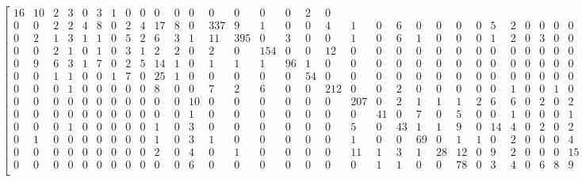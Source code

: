 \begin{equation*}
\begin{bmatrix}
16	&	10	&	2	&	3	&	0	&	3	&	1	&	0	&	0	&	0	&	0	&	0	&	0	&	0	&	0	&	0	&	2	&	0 \\
0	&	0	&	2	&	2	&	4	&	8	&	0	&	2	&	4	&	17	&	8	&	0	&	337	&	9	&	1	&	0	&	0	&	4	&	1	&	0	&	6	&	0	&	0	&	0	&	0	&
5	&	2	&	0	&	0	&	0	&	0	&	0	&	8	&	0	&	0	&	0	&	0	&	0	&	0	&	0	&	0	&	0	&	0 \\
0	&	2	&	1	&	3	&	1	&	1	&	0	&	5	&	2	&	6	&	3	&	1	&	11	&	395	&	0	&	3	&	0	&	0	&	1	&	0	&	6	&	1	&	0	&	0	&	0	&
1	&	2	&	0	&	3	&	0	&	0	&	0	&	0	&	0	&	0	&	0	&	0	&	0	&	0	&	0	&	0	&	0	&	2 \\
0	&	0	&	2	&	1	&	0	&	1	&	0	&	3	&	1	&	2	&	2	&	0	&	2	&	0	&	154	&	0	&	0	&	12	&	0	&	0	&	0	&	0	&	0	&	0	&	0	&
0	&	0	&	0	&	0	&	0	&	0	&	0	&	0	&	0	&	0	&	0	&	0	&	0	&	0	&	0	&	0	&	0	&	0 \\
0	&	9	&	6	&	3	&	1	&	7	&	0	&	2	&	5	&	14	&	1	&	0	&	1	&	1	&	1	&	96	&	1	&	0	&	0	&	0	&	0	&	0	&	0	&	0	&	0	&
0	&	0	&	0	&	0	&	0	&	0	&	0	&	1	&	0	&	0	&	0	&	0	&	0	&	0	&	0	&	0	&	0	&	1 \\
0	&	0	&	1	&	1	&	0	&	0	&	1	&	7	&	0	&	25	&	1	&	0	&	0	&	0	&	0	&	0	&	54	&	0	&	0	&	0	&	0	&	0	&	0	&	0	&	0	&
0	&	0	&	0	&	0	&	0	&	0	&	0	&	0	&	0	&	0	&	0	&	0	&	0	&	0	&	0	&	0	&	0	&	0 \\
0	&	0	&	0	&	1	&	0	&	0	&	0	&	0	&	0	&	8	&	0	&	0	&	7	&	2	&	6	&	0	&	0	&	212	&	0	&	0	&	2	&	0	&	0	&	0	&	0	&
0	&	1	&	0	&	0	&	1	&	0	&	0	&	0	&	0	&	0	&	0	&	0	&	0	&	0	&	0	&	0	&	0	&	0 \\
0	&	0	&	0	&	0	&	0	&	0	&	0	&	0	&	0	&	0	&	0	&	10	&	0	&	0	&	0	&	0	&	0	&	0	&	207	&	0	&	2	&	1	&	1	&	1	&	2	&
6	&	6	&	0	&	2	&	0	&	2	&	0	&	0	&	0	&	0	&	0	&	0	&	0	&	0	&	0	&	0	&	0	&	0 \\
0	&	0	&	0	&	0	&	0	&	0	&	0	&	0	&	0	&	0	&	0	&	1	&	0	&	0	&	0	&	0	&	0	&	0	&	0	&	41	&	0	&	7	&	0	&	5	&	0	&
0	&	1	&	0	&	0	&	0	&	1	&	4	&	0	&	0	&	0	&	0	&	0	&	0	&	0	&	0	&	0	&	0	&	0 \\
0	&	0	&	0	&	1	&	0	&	0	&	0	&	0	&	0	&	1	&	0	&	3	&	0	&	0	&	0	&	0	&	0	&	0	&	5	&	0	&	43	&	1	&	1	&	9	&	0	&
14	&	4	&	0	&	2	&	0	&	2	&	0	&	0	&	0	&	0	&	0	&	0	&	0	&	0	&	0	&	0	&	0	&	4 \\
0	&	1	&	0	&	0	&	0	&	0	&	0	&	0	&	0	&	1	&	0	&	3	&	1	&	0	&	0	&	0	&	0	&	0	&	1	&	0	&	0	&	69	&	0	&	1	&	1	&
0	&	2	&	0	&	0	&	0	&	4	&	6	&	0	&	0	&	0	&	0	&	0	&	0	&	0	&	0	&	0	&	0	&	0 \\
0	&	0	&	0	&	0	&	0	&	0	&	0	&	0	&	0	&	2	&	0	&	4	&	0	&	1	&	0	&	0	&	0	&	0	&	11	&	1	&	3	&	1	&	28	&	12	&	0	&
9	&	2	&	0	&	0	&	0	&	15	&	1	&	0	&	0	&	0	&	0	&	0	&	0	&	0	&	0	&	0	&	0	&	0 \\
0	&	0	&	0	&	0	&	0	&	0	&	0	&	0	&	0	&	0	&	0	&	6	&	0	&	0	&	0	&	0	&	0	&	0	&	0	&	1	&	1	&	0	&	0	&	78	&	0	&
3	&	4	&	0	&	6	&	8	&	9	&	4	&	0	&	0	&	0	&	0	&	0	&	0	&	0	&	0	&	0	&	0	&	0 \\

\end{bmatrix}
\end{equation*}
